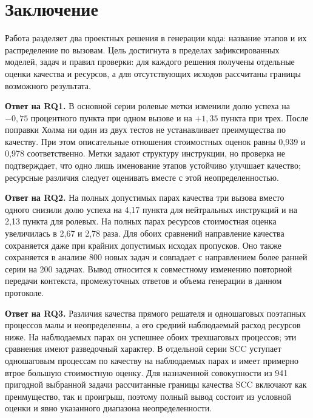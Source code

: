 \FloatBarrier
\section{Заключение}\label{sec:conclusion}
Работа разделяет два проектных решения в генерации кода: название этапов и их распределение по вызовам. Цель достигнута в пределах зафиксированных моделей, задач и правил проверки: для каждого решения получены отдельные оценки качества и ресурсов, а для отсутствующих исходов рассчитаны границы возможного результата.

\textbf{Ответ на RQ1.} В основной серии ролевые метки изменили долю успеха на $-0{,}75$ процентного пункта при одном вызове и на $+1{,}35$ пункта при трех. После поправки Холма ни один из двух тестов не устанавливает преимущества по качеству. При этом описательные отношения стоимостных оценок равны 0,939 и 0,978 соответственно. Метки задают структуру инструкции, но проверка не подтверждает, что одно лишь именование этапов устойчиво улучшает качество; ресурсные различия следует оценивать вместе с этой неопределенностью.

\textbf{Ответ на RQ2.} На полных допустимых парах качества три вызова вместо одного снизили долю успеха на 4,17 пункта для нейтральных инструкций и на 2,13 пункта для ролевых. На полных парах ресурсов стоимостная оценка увеличилась в 2,67 и 2,78 раза. Для обоих сравнений направление качества сохраняется даже при крайних допустимых исходах пропусков. Оно также сохраняется в анализе 800 новых задач и совпадает с направлением более ранней серии на 200 задачах. Вывод относится к совместному изменению повторной передачи контекста, промежуточных ответов и объема генерации в данном протоколе.

\textbf{Ответ на RQ3.} Различия качества прямого решателя и одношаговых поэтапных процессов малы и неопределенны, а его средний наблюдаемый расход ресурсов ниже. На наблюдаемых парах он успешнее обоих трехшаговых процессов; эти сравнения имеют разведочный характер. В отдельной серии SCC уступает одношаговым процессам по качеству на наблюдаемых парах и имеет примерно втрое большую стоимостную оценку. Для назначенной совокупности из 941 пригодной выбранной задачи рассчитанные границы качества SCC включают как преимущество, так и проигрыш, поэтому полный вывод состоит из условной оценки и явно указанного диапазона неопределенности.

